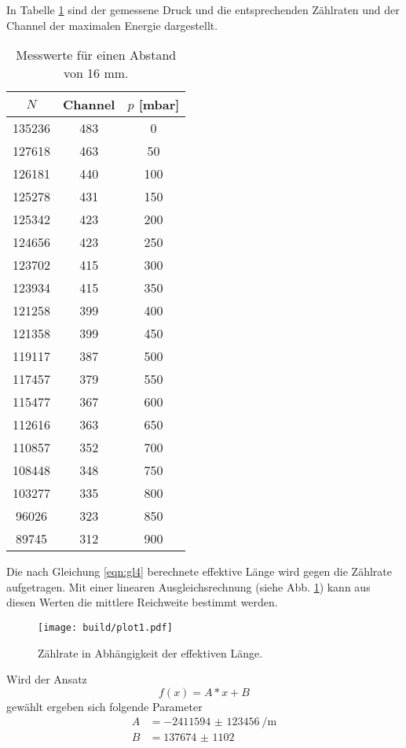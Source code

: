In Tabelle \ref{tab:M1} sind der gemessene Druck und die entsprechenden Zählraten und der Channel der maximalen Energie dargestellt.
\begin{table}
  \centering
  \caption{Messwerte für einen Abstand von 16 mm.}
  \label{tab:M1}
  \begin{tabular}{c c c}
    \toprule
    $N$ & Channel & $p$ [mbar] \\
    \midrule
    135236 &  483 &  0 \\
    127618 &  463 &  50 \\
    126181 &  440 &  100 \\
    125278 &  431 &  150 \\
    125342 &  423 &  200 \\
    124656 &  423 &  250 \\
    123702 &  415 &  300 \\
    123934 &  415 &  350 \\
    121258 &  399 &  400 \\
    121358 &  399 &  450 \\
    119117 &  387 &  500 \\
    117457 &  379 &  550 \\
    115477 &  367 &  600 \\
    112616 &  363 &  650 \\
    110857 &  352 &  700 \\
    108448 &  348 &  750 \\
    103277 &  335 &  800 \\
    96026  & 323  & 850 \\
    89745  & 312  & 900 \\
    \bottomrule
  \end{tabular}
\end{table}
Die nach Gleichung \eqref{eqn:gl4} berechnete effektive Länge wird gegen die Zählrate aufgetragen.
Mit einer linearen Ausgleichsrechnung (siehe Abb. \ref{fig:plot1}) kann aus diesen Werten die mittlere Reichweite bestimmt werden.
\begin{figure}
  \centering
  \texttt{[image: build/plot1.pdf]}
  \caption{Zählrate in Abhängigkeit der effektiven Länge.}
  \label{fig:plot1}
\end{figure}
Wird der Ansatz
\begin{equation*}
  f(x) = A*x + B
\end{equation*}
gewählt ergeben sich folgende Parameter
\begin{align*}
  A &= \SI{-2411594(123456)}{\per\meter} \\
  B &= \num{137674(1102)}
\end{align*}
